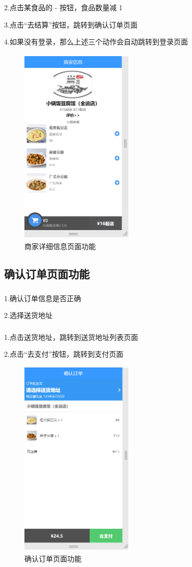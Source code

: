 2.点击某食品的 - 按钮，食品数量减 1

3.点击“去结算”按钮，跳转到确认订单页面

4.如果没有登录，那么上述三个动作会自动跳转到登录页面
\begin{figure}[H]
    \centering
    \includegraphics[width=5.4cm,height=9.6cm]{figures/3.1.3.png}
    \caption{商家详细信息页面功能}
\end{figure}

\subsection{确认订单页面功能}
\subsubsection*{}
1.确认订单信息是否正确

2.选择送货地址
\subsubsection*{}
1.点击送货地址，跳转到送货地址列表页面

2.点击“去支付”按钮，跳转到支付页面
\begin{figure}[H]
    \centering
    \includegraphics[width=5.4cm,height=9.6cm]{figures/3.1.4.png}
    \caption{确认订单页面功能}
\end{figure}


